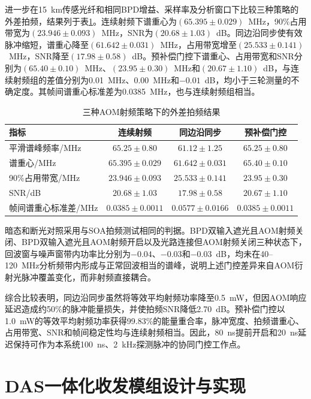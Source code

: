 进一步在15~km传感光纤和相同BPD增益、采样率及分析窗口下比较三种策略的外差拍频，结果列于表\ref{tab:chap3_gating_beat_results}。连续射频下谱重心为$(65.395\pm0.029)$~MHz，90\%占用带宽为$(23.946\pm0.093)$~MHz，SNR为$(20.68\pm1.03)$~dB。同边沿同步使有效脉冲缩短，谱重心降至$(61.642\pm0.031)$~MHz，占用带宽增至$(25.533\pm0.141)$~MHz，SNR降至$(17.98\pm0.58)$~dB。预补偿门控下谱重心、占用带宽和SNR分别为$(65.40\pm0.10)$~MHz、$(23.95\pm0.30)$~MHz和$(20.67\pm1.10)$~dB，与连续射频组的差值分别为0.01~MHz、0.00~MHz和$-0.01$~dB，均小于三轮测量的不确定度。其帧间谱重心标准差为0.0385~MHz，也与连续射频组相当。

\begin{table}[htbp]
  \centering
  \caption{三种AOM射频策略下的外差拍频结果}
  \label{tab:chap3_gating_beat_results}
  \begin{tabular}{lccc}
    \toprule
    指标 & 连续射频 & 同边沿同步 & 预补偿门控 \\
    \midrule
    平滑谱峰频率/MHz & $65.25\pm0.80$ & $61.12\pm1.25$ & $65.25\pm0.80$ \\
    谱重心/MHz & $65.395\pm0.029$ & $61.642\pm0.031$ & $65.40\pm0.10$ \\
    90\%占用带宽/MHz & $23.946\pm0.093$ & $25.533\pm0.141$ & $23.95\pm0.30$ \\
    SNR/dB & $20.68\pm1.03$ & $17.98\pm0.58$ & $20.67\pm1.10$ \\
    帧间谱重心标准差/MHz & $0.0385\pm0.0011$ & $0.0577\pm0.0166$ & $0.0385\pm0.0011$ \\
    \bottomrule
  \end{tabular}
\end{table}

暗态和断光对照采用与SOA拍频测试相同的判据。BPD双输入遮光且AOM射频关闭、BPD双输入遮光且AOM射频开启以及光路连接但AOM射频关闭三种状态下，回波窗与噪声窗带内功率比分别为$-0.04$、$-0.03$和$-0.03$~dB，均未在40--120~MHz分析频带内形成与正常回波相当的谱峰，说明上述门控差异来自AOM衍射光脉冲覆盖变化，而非射频直接耦合。

综合比较表明，同边沿同步虽然将等效平均射频功率降至0.5~mW，但因AOM响应延迟造成约50\%的脉冲能量损失，并使拍频SNR降低2.70~dB。预补偿门控以1.0~mW的等效平均射频功率获得99.83\%的能量重合率，脉冲宽度、拍频谱重心、占用带宽、SNR和帧间稳定性均与连续射频相当。因此，80~ns提前开启和20~ns延迟保持可作为本系统100~ns、2~kHz探测脉冲的协同门控工作点。

\section{DAS一体化收发模组设计与实现}
\label{sec:chap3_module_implementation}

